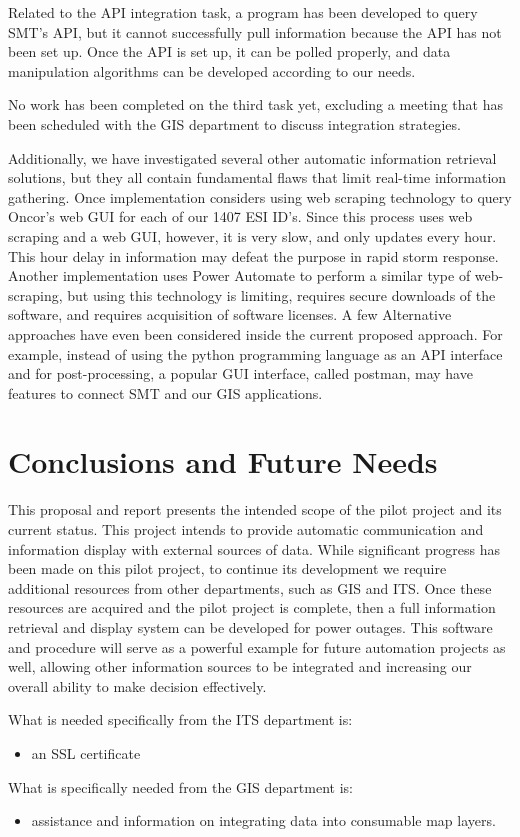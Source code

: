 \documentclass[]{amsldoc}
\begin{document}
Related to the API integration task, a program has been developed to query SMT's API, but it cannot successfully pull information because the API has not been set up. Once the API is set up, it can be polled properly, and data manipulation algorithms can be developed according to our needs.

No work has been completed on the third task yet, excluding a meeting that has been scheduled with the GIS department to discuss integration strategies. 

Additionally, we have investigated several other automatic information retrieval solutions, but they all contain fundamental flaws that limit real-time information gathering. Once implementation considers using web scraping technology to query Oncor's web GUI for each of our 1407 ESI ID's. Since this process uses web scraping and a web GUI, however, it is very slow, and only updates every hour. This hour delay in information may defeat the purpose in rapid storm response. Another implementation uses Power Automate to perform a similar type of web-scraping, but using this technology is limiting, requires secure downloads of the software, and requires acquisition of software licenses. A few Alternative approaches have even been considered inside the current proposed approach. For example, instead of using the python programming language as an API interface and for post-processing, a popular GUI interface, called postman, may have features to connect SMT and our GIS applications.

\section{Conclusions and Future Needs}

This proposal and report presents the intended scope of the pilot project and its current status. This project intends to provide automatic communication and information display with external sources of data. While significant progress has been made on this pilot project, to continue its development we require additional resources from other departments, such as GIS and ITS. Once these resources are acquired and the pilot project is complete, then a full information retrieval and display system can be developed for power outages. This software and procedure will serve as a powerful example for future automation projects as well, allowing other information sources to be integrated and increasing our overall ability to make decision effectively.

What is needed specifically from the ITS department is:
\begin{itemize}
    \item an SSL certificate
\end{itemize}

What is specifically needed from the GIS department is:
\begin{itemize}
    \item assistance and information on integrating data into consumable map layers.
\end{itemize}
\end{document}
